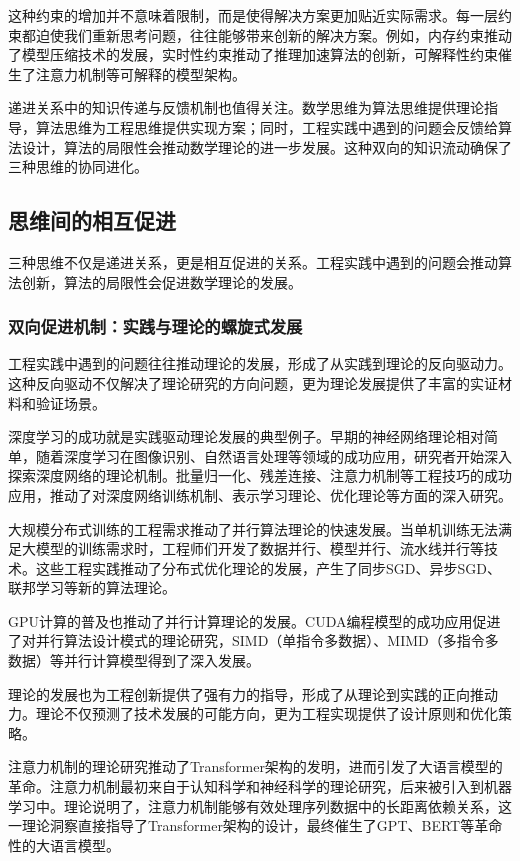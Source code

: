 这种约束的增加并不意味着限制，而是使得解决方案更加贴近实际需求。每一层约束都迫使我们重新思考问题，往往能够带来创新的解决方案。例如，内存约束推动了模型压缩技术的发展，实时性约束推动了推理加速算法的创新，可解释性约束催生了注意力机制等可解释的模型架构。

递进关系中的知识传递与反馈机制也值得关注。数学思维为算法思维提供理论指导，算法思维为工程思维提供实现方案；同时，工程实践中遇到的问题会反馈给算法设计，算法的局限性会推动数学理论的进一步发展。这种双向的知识流动确保了三种思维的协同进化。

\subsection{思维间的相互促进}

三种思维不仅是递进关系，更是相互促进的关系。工程实践中遇到的问题会推动算法创新，算法的局限性会促进数学理论的发展。

\subsubsection{双向促进机制：实践与理论的螺旋式发展}

工程实践中遇到的问题往往推动理论的发展，形成了从实践到理论的反向驱动力。这种反向驱动不仅解决了理论研究的方向问题，更为理论发展提供了丰富的实证材料和验证场景。

深度学习的成功就是实践驱动理论发展的典型例子。早期的神经网络理论相对简单，随着深度学习在图像识别、自然语言处理等领域的成功应用，研究者开始深入探索深度网络的理论机制。批量归一化、残差连接、注意力机制等工程技巧的成功应用，推动了对深度网络训练机制、表示学习理论、优化理论等方面的深入研究。

大规模分布式训练的工程需求推动了并行算法理论的快速发展。当单机训练无法满足大模型的训练需求时，工程师们开发了数据并行、模型并行、流水线并行等技术。这些工程实践推动了分布式优化理论的发展，产生了同步SGD、异步SGD、联邦学习等新的算法理论。

GPU计算的普及也推动了并行计算理论的发展。CUDA编程模型的成功应用促进了对并行算法设计模式的理论研究，SIMD（单指令多数据）、MIMD（多指令多数据）等并行计算模型得到了深入发展。

理论的发展也为工程创新提供了强有力的指导，形成了从理论到实践的正向推动力。理论不仅预测了技术发展的可能方向，更为工程实现提供了设计原则和优化策略。

注意力机制的理论研究推动了Transformer架构的发明，进而引发了大语言模型的革命。注意力机制最初来自于认知科学和神经科学的理论研究，后来被引入到机器学习中。理论说明了，注意力机制能够有效处理序列数据中的长距离依赖关系，这一理论洞察直接指导了Transformer架构的设计，最终催生了GPT、BERT等革命性的大语言模型。

